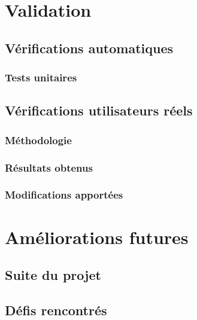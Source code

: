 \documentclass{EPL-master-thesis-covers-FR}
\begin{document}
			

	\chapter{Validation}


		\section{Vérifications automatiques}

			\subsection*{Tests unitaires}

			

		\section{Vérifications utilisateurs réels}


			\subsection*{Méthodologie}

				

			\subsection*{Résultats obtenus}

				

			\subsection*{Modifications apportées}

		

	\chapter{Améliorations futures}


		\section{Suite du projet}
			\label{ref:suite_projet}

		

		\section{Défis rencontrés}
\end{document}
